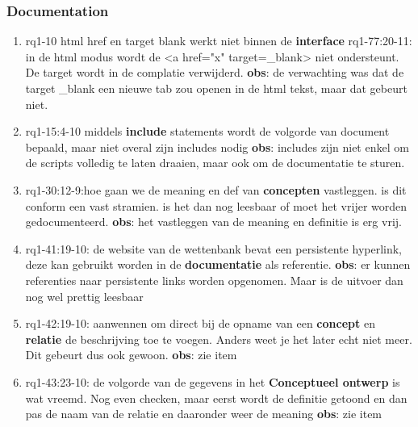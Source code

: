 \subsubsection{Documentation}
\begin{comment}
plaats hier de afgehandelde items.
\end{comment}
\begin{enumerate}
    \item rq1-10 html href en target blank werkt niet binnen de \textbf{interface}   
    \newline rq1-77:20-11: in de html modus wordt de <a href="x" target=\_blank> niet ondersteunt. 
    De target wordt in de complatie verwijderd.    
    \newline\textbf{obs}: de verwachting was dat de target \_blank een nieuwe tab zou openen in de html tekst, maar dat gebeurt niet.
    
    \item rq1-15:4-10 middels \textbf{include} statements wordt de volgorde van document bepaald, maar niet overal zijn includes nodig
    \newline\textbf{obs}: includes zijn niet enkel om de scripts volledig te laten draaien, maar ook om de documentatie te sturen.
    
    \item rq1-30:12-9:hoe gaan we de meaning en def van \textbf{concepten} vastleggen. 
    is dit conform een vast stramien. 
    is het dan nog leesbaar of moet het vrijer worden gedocumenteerd.
    \newline\textbf{obs}: het vastleggen van de meaning en definitie is erg vrij.
    
    \item rq1-41:19-10: de website van de wettenbank bevat een persistente hyperlink, deze kan gebruikt worden in de \textbf{documentatie} als referentie.
    \newline\textbf{obs}: er kunnen referenties naar persistente links worden opgenomen. 
    Maar is de uitvoer dan nog wel prettig leesbaar
    
    \item rq1-42:19-10: aanwennen om direct bij de opname van een \textbf{concept} en \textbf{relatie} de beschrijving toe te voegen. Anders weet je het later echt niet meer. Dit gebeurt dus ook gewoon.
    \newline\textbf{obs}: zie item
    
    \item rq1-43:23-10: de volgorde van de gegevens in het \textbf{Conceptueel ontwerp} is wat vreemd. Nog even checken, maar eerst wordt de definitie getoond en dan pas de naam van de relatie en daaronder weer de meaning
    \newline\textbf{obs}: zie item
    

\end{enumerate}
